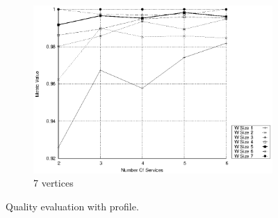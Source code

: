 \begin{figure}[!htb]
\begin{subfigure}{0.33\textwidth}
    \includegraphics[width=\textwidth]{Images/graphs/window_quality_performance_diff_qual_n7_s7_50_80_n7}
    \caption{7 vertices}
    \label{fig:quality_window_average_qualitative_n7}
  \end{subfigure}

  \caption{ Quality evaluation with \wide profile.}
  \label{fig:quality_window_average_qualitative}
\end{figure}



